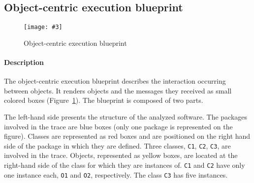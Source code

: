 \documentclass[10pt, conference, compsocconf]{IEEEtran}
\newcommand{\ct}{\lstinline[backgroundcolor=\color{white},basicstyle=\footnotesize\ttfamily]}
\newcommand{\fig}[4]{
	\begin{figure}[#1]
		\centering
		\texttt{[image: \#3]}
		\caption{\label{fig:#3}#4}
	\end{figure}}
\newcommand{\figref}[1]{Figure~\ref{fig:#1}}
\begin{document}


%

\subsection{Object-centric execution blueprint}

\fig{}{0.4}{ObjectCentricBlueprint}{Object-centric execution blueprint}

\paragraph{Description}
The object-centric execution blueprint describes the interaction occurring between objects. It renders objects and the messages they received as small colored boxes (\figref{ObjectCentricBlueprint}). The blueprint is composed of two parts.

The left-hand side presents the structure of the analyzed software. The packages involved in the trace are blue boxes (only one package is represented on the figure). 
Classes are represented as red boxes and are positioned on the right hand side of the package in which they are defined. Three classes, \ct{C1}, \ct{C2}, \ct{C3}, are involved in the trace. Objects, represented as yellow boxes, are located at the right-hand side of the class for which they are instances of. \ct{C1} and \ct{C2} have only one instance each, \ct{O1} and \ct{O2}, respectively. The class \ct{C3} has five instances.
\end{document}
